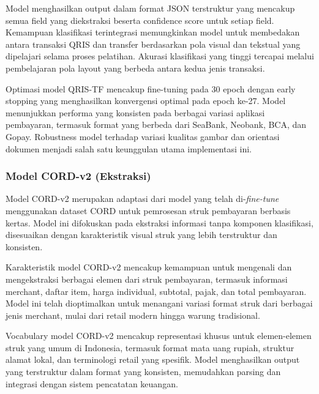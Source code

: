 Model menghasilkan output dalam format JSON terstruktur yang mencakup semua field yang diekstraksi beserta confidence score untuk setiap field. Kemampuan klasifikasi terintegrasi memungkinkan model untuk membedakan antara transaksi QRIS dan transfer berdasarkan pola visual dan tekstual yang dipelajari selama proses pelatihan. Akurasi klasifikasi yang tinggi tercapai melalui pembelajaran pola layout yang berbeda antara kedua jenis transaksi.

Optimasi model QRIS-TF mencakup fine-tuning pada 30 epoch dengan early stopping yang menghasilkan konvergensi optimal pada epoch ke-27. Model menunjukkan performa yang konsisten pada berbagai variasi aplikasi pembayaran, termasuk format yang berbeda dari SeaBank, Neobank, BCA, dan Gopay. Robustness model terhadap variasi kualitas gambar dan orientasi dokumen menjadi salah satu keunggulan utama implementasi ini.

\subsubsection{Model CORD-v2 (Ekstraksi)}
\label{subsubsec:model-cord-v2}

Model CORD-v2 merupakan adaptasi dari model \donut{} yang telah di-\emph{fine-tune} menggunakan dataset CORD untuk pemrosesan struk pembayaran berbasis kertas. Model ini difokuskan pada ekstraksi informasi tanpa komponen klasifikasi, disesuaikan dengan karakteristik visual struk yang lebih terstruktur dan konsisten.


Karakteristik model CORD-v2 mencakup kemampuan untuk mengenali dan mengekstraksi berbagai elemen dari struk pembayaran, termasuk informasi merchant, daftar item, harga individual, subtotal, pajak, dan total pembayaran. Model ini telah dioptimalkan untuk menangani variasi format struk dari berbagai jenis merchant, mulai dari retail modern hingga warung tradisional.

Vocabulary model CORD-v2 mencakup representasi khusus untuk elemen-elemen struk yang umum di Indonesia, termasuk format mata uang rupiah, struktur alamat lokal, dan terminologi retail yang spesifik. Model menghasilkan output yang terstruktur dalam format yang konsisten, memudahkan parsing dan integrasi dengan sistem pencatatan keuangan.

